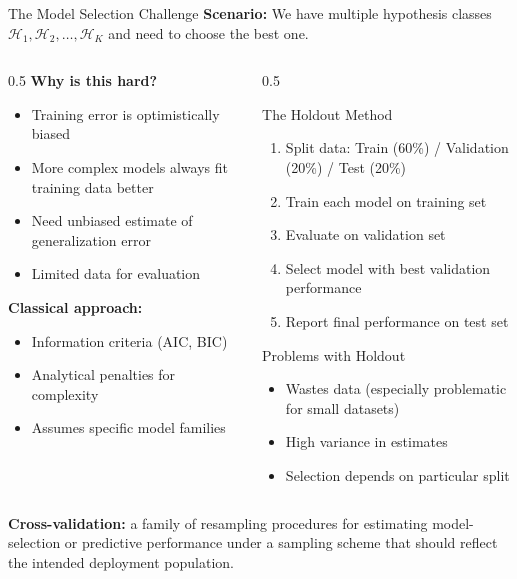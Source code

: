\documentclass[aspectratio=169,11pt]{beamer}
\begin{document}
\begin{frame}{The Model Selection Challenge}
\textbf{Scenario:} We have multiple hypothesis classes $\mathcal{H}_1, \mathcal{H}_2, \ldots, \mathcal{H}_K$ and need to choose the best one.

\begin{columns}
\begin{column}{0.5\textwidth}
\textbf{Why is this hard?}
\begin{itemize}
\item Training error is optimistically biased
\item More complex models always fit training data better
\item Need unbiased estimate of generalization error
\item Limited data for evaluation
\end{itemize}

\vspace{0.3cm}
\textbf{Classical approach:}
\begin{itemize}
\item Information criteria (AIC, BIC)
\item Analytical penalties for complexity
\item Assumes specific model families
\end{itemize}
\end{column}
\begin{column}{0.5\textwidth}
\begin{block}{The Holdout Method}
\begin{enumerate}
\item Split data: Train (60\%) / Validation (20\%) / Test (20\%)
\item Train each model on training set
\item Evaluate on validation set
\item Select model with best validation performance
\item Report final performance on test set
\end{enumerate}
\end{block}

\begin{alertblock}{Problems with Holdout}
\begin{itemize}
\item Wastes data (especially problematic for small datasets)
\item High variance in estimates
\item Selection depends on particular split
\end{itemize}
\end{alertblock}
\end{column}
\end{columns}

\vspace{0.3cm}
\textbf{Cross-validation:} a family of resampling procedures for estimating model-selection or predictive performance under a sampling scheme that should reflect the intended deployment population.
\end{frame}
\end{document}
